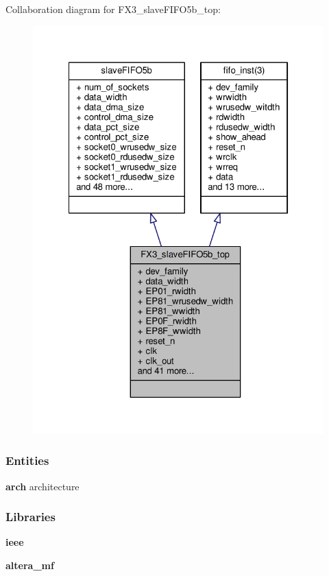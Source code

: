 Collaboration diagram for F\+X3\+\_\+slave\+F\+I\+F\+O5b\+\_\+top\+:\nopagebreak
\begin{figure}[H]
\begin{center}
\leavevmode
\includegraphics[width=322pt]{df/d3b/classFX3__slaveFIFO5b__top__coll__graph}
\end{center}
\end{figure}
\subsubsection*{Entities}
\begin{DoxyCompactItemize}
\item 
{\bf arch} architecture
\end{DoxyCompactItemize}
\subsubsection*{Libraries}
 \begin{DoxyCompactItemize}
\item 
{\bf ieee} 
\item 
{\bf altera\+\_\+mf} 
\end{DoxyCompactItemize}
